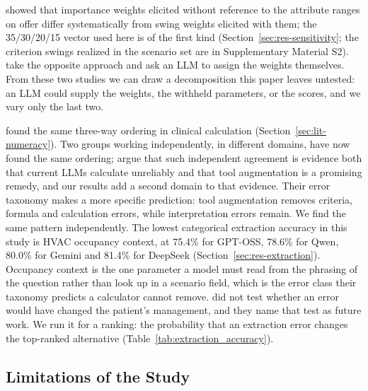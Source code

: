 \documentclass[final,3p,times]{elsarticle}
\begin{document}
\citet{vonnitzsch1993} showed that importance weights elicited without reference to the attribute ranges on offer differ systematically from swing weights elicited with them; the 35/30/20/15 vector used here is of the first kind (Section~\ref{sec:res-sensitivity}; the criterion swings realized in the scenario set are in Supplementary Material S2). \citet{vahidnia2025walmas} take the opposite approach and ask an LLM to assign the weights themselves. From these two studies we can draw a decomposition this paper leaves untested: an LLM could supply the weights, the withheld parameters, or the scores, and we vary only the last two.

\citet{goodell2025} found the same three-way ordering in clinical calculation (Section~\ref{sec:lit-numeracy}). Two groups working independently, in different domains, have now found the same ordering; \citet{goodell2025} argue that such independent agreement is evidence both that current LLMs calculate unreliably and that tool augmentation is a promising remedy, and our results add a second domain to that evidence. Their error taxonomy makes a more specific prediction: tool augmentation removes criteria, formula and calculation errors, while interpretation errors remain. We find the same pattern independently. The lowest categorical extraction accuracy in this study is HVAC occupancy context, at 75.4\% for GPT-OSS, 78.6\% for Qwen, 80.0\% for Gemini and 81.4\% for DeepSeek (Section~\ref{sec:res-extraction}). Occupancy context is the one parameter a model must read from the phrasing of the question rather than look up in a scenario field, which is the error class their taxonomy predicts a calculator cannot remove. \citet{goodell2025} did not test whether an error would have changed the patient's management, and they name that test as future work. We run it for a ranking: the probability that an extraction error changes the top-ranked alternative (Table~\ref{tab:extraction_accuracy}).
\FloatBarrier
\subsection{Limitations of the Study}
\label{sec:limitations}
\end{document}
